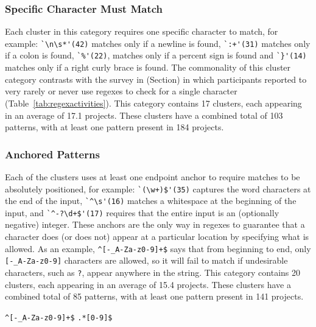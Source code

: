 \subsubsection{Specific Character Must Match}
\label{cluster:single}
Each cluster in this category requires one specific character to match, for example:
\verb!`\n\s*'(42)! matches only if a newline is found, \verb!`:+'(31)! matches only if a colon is found, \verb!`%'(22)!, matches only if a percent sign is found and \verb!`}'(14)! matches only if a right curly brace is found.
The commonality of this cluster category contrasts with the survey in
(Section) in which participants reported to very rarely or never use regexes to check for a single character (Table~\ref{tab:regexactivities}).
This category contains 17 clusters, each appearing in an average of 17.1 projects.
 These clusters have a combined total of 103 patterns, with at least one pattern present in 184 projects.

\subsubsection{Anchored Patterns}
Each of the clusters uses at least one endpoint anchor to require matches to be absolutely positioned, for example:
\verb!`(\w+)$'(35)! captures the word characters at the end of the input, \verb!`^\s'(16)! matches a whitespace at the beginning of the input, and \verb!`^-?\d+$'(17)! requires that the entire input is an (optionally negative) integer.
These anchors are the only way in regexes to guarantee that a character does (or does not) appear at a particular location by specifying what is allowed. As an example, \verb!^[-_A-Za-z0-9]+$! says that from beginning to end, only \verb![-_A-Za-z0-9]! characters are allowed, so it will fail to match if undesirable characters, such as \verb!?!, appear anywhere in the string.
This category contains 20 clusters, each appearing in an average of 15.4 projects.
These clusters have a combined total of 85 patterns, with at least one pattern present in 141 projects.

\verb!^[-_A-Za-z0-9]+$!
\verb!.*[0-9]$!

